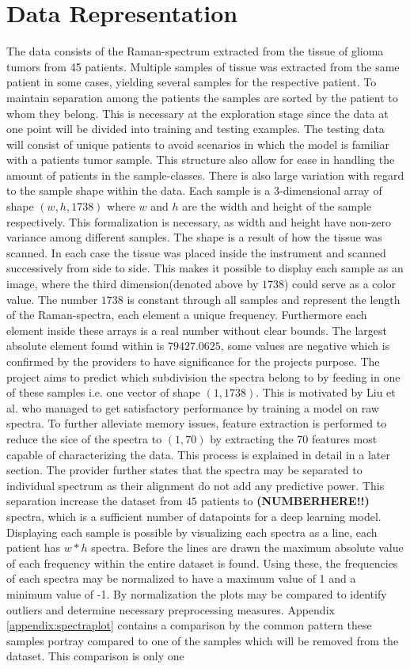 \section{Data Representation}
The data consists of the Raman-spectrum extracted from the tissue of glioma tumors from 45 patients. Multiple samples of tissue was extracted from the same patient in some cases, yielding several samples for the respective patient. To maintain separation among the patients the samples are sorted by the patient to whom they belong. This is necessary at the exploration stage since the data at one point will be divided into training and testing examples. The testing data will consist of unique patients to avoid scenarios in which the model is familiar with a patients tumor sample. This structure also allow for ease in handling the amount of patients in the sample-classes. There is also large variation with regard to the sample shape within the data. Each sample is a 3-dimensional array of shape $(w, h, 1738)$ where $w$ and $h$ are the width and height of the sample respectively. This formalization is necessary, as width and height have non-zero variance among different samples. The shape is a result of how the tissue was scanned. In each case the tissue was placed inside the instrument and scanned successively from side to side. This makes it possible to display each sample as an image, where the third dimension(denoted above by $1738$) could serve as a color value. The number $1738$ is constant through all samples and represent the length of the Raman-spectra, each element a unique frequency. Furthermore each element inside these arrays is a real number without clear bounds. The largest absolute element found within is $79427.0625$, some values are negative which is confirmed by the providers to have significance for the projects purpose. The project aims to predict which subdivision the spectra belong to by feeding in one of these samples i.e. one vector of shape $(1, 1738)$. This is motivated by Liu et al.\cite{liu2017deep} who managed to get satisfactory performance by training a model on raw spectra. To further alleviate memory issues, feature extraction is performed to reduce the sice of the spectra to $(1, 70)$ by extracting the 70 features most capable of characterizing the data. This process is explained in detail in a later section. The provider further states that the spectra may be separated to individual spectrum as their alignment do not add any predictive power. This separation increase the dataset from $45$ patients to \textbf{(NUMBERHERE!!)} spectra, which is a sufficient number of datapoints for a deep learning model. Displaying each sample is possible by visualizing each spectra as a line, each patient has $w * h$ spectra. Before the lines are drawn the maximum absolute value of each frequency within the entire dataset is found. Using these, the frequencies of each spectra may be normalized to have a maximum value of 1 and a minimum value of -1. By normalization the plots may be compared to identify outliers and determine necessary preprocessing measures. Appendix \ref{appendix:spectraplot} contains a comparison by the common pattern these samples portray compared to one of the samples which will be removed from the dataset. This comparison is only one 